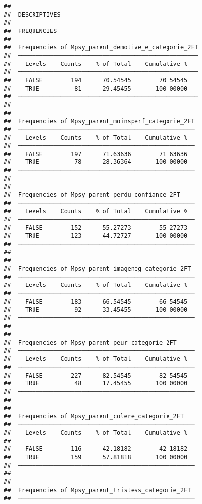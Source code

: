 \documentclass[
]{article}
\begin{document}
\begin{verbatim}
## 
##  DESCRIPTIVES
## 
##  FREQUENCIES
## 
##  Frequencies of Mpsy_parent_demotive_e_categorie_2FT 
##  ─────────────────────────────────────────────────── 
##    Levels    Counts    % of Total    Cumulative %   
##  ─────────────────────────────────────────────────── 
##    FALSE        194      70.54545        70.54545   
##    TRUE          81      29.45455       100.00000   
##  ─────────────────────────────────────────────────── 
## 
## 
##  Frequencies of Mpsy_parent_moinsperf_categorie_2FT 
##  ────────────────────────────────────────────────── 
##    Levels    Counts    % of Total    Cumulative %   
##  ────────────────────────────────────────────────── 
##    FALSE        197      71.63636        71.63636   
##    TRUE          78      28.36364       100.00000   
##  ────────────────────────────────────────────────── 
## 
## 
##  Frequencies of Mpsy_parent_perdu_confiance_2FT     
##  ────────────────────────────────────────────────── 
##    Levels    Counts    % of Total    Cumulative %   
##  ────────────────────────────────────────────────── 
##    FALSE        152      55.27273        55.27273   
##    TRUE         123      44.72727       100.00000   
##  ────────────────────────────────────────────────── 
## 
## 
##  Frequencies of Mpsy_parent_imageneg_categorie_2FT  
##  ────────────────────────────────────────────────── 
##    Levels    Counts    % of Total    Cumulative %   
##  ────────────────────────────────────────────────── 
##    FALSE        183      66.54545        66.54545   
##    TRUE          92      33.45455       100.00000   
##  ────────────────────────────────────────────────── 
## 
## 
##  Frequencies of Mpsy_parent_peur_categorie_2FT      
##  ────────────────────────────────────────────────── 
##    Levels    Counts    % of Total    Cumulative %   
##  ────────────────────────────────────────────────── 
##    FALSE        227      82.54545        82.54545   
##    TRUE          48      17.45455       100.00000   
##  ────────────────────────────────────────────────── 
## 
## 
##  Frequencies of Mpsy_parent_colere_categorie_2FT    
##  ────────────────────────────────────────────────── 
##    Levels    Counts    % of Total    Cumulative %   
##  ────────────────────────────────────────────────── 
##    FALSE        116      42.18182        42.18182   
##    TRUE         159      57.81818       100.00000   
##  ────────────────────────────────────────────────── 
## 
## 
##  Frequencies of Mpsy_parent_tristess_categorie_2FT  
##  ────────────────────────────────────────────────── 

\end{verbatim}
\end{document}
